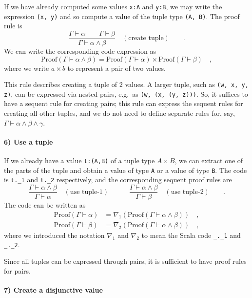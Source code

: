 If we have already computed some values \lstinline!x:A! and \lstinline!y:B!,
we may write the expression \lstinline!(x, y)! and so compute a value
of the tuple type \lstinline!(A, B)!. The proof rule is
\[
\frac{\Gamma\vdash\alpha\quad\quad\Gamma\vdash\beta}{\Gamma\vdash\alpha\wedge\beta}\quad(\text{create tuple})\quad\quad.
\]
We can write the corresponding code expression as
\[
\text{Proof}\left(\Gamma\vdash\alpha\wedge\beta\right)=\text{Proof}\left(\Gamma\vdash\alpha\right)\times\text{Proof}\left(\Gamma\vdash\beta\right)\quad,
\]
where we write $a\times b$ to represent a pair of two values.

This rule describes creating a tuple of $2$ values. A larger tuple,
such as \lstinline!(w, x, y, z)!, can be expressed via nested pairs,
e.g.~as \lstinline!(w, (x, (y, z)))!. So, it suffices to have a
sequent rule for creating pairs; this rule can express the sequent
rules for creating all other tuples, and we do not need to define
separate rules for, say, $\Gamma\vdash\alpha\wedge\beta\wedge\gamma$.

\paragraph{6) Use a tuple}

If we already have a value \lstinline!t:(A,B)! of a tuple type $A\times B$,
we can extract one of the parts of the tuple and obtain a value of
type \lstinline!A! or a value of type \lstinline!B!. The code is
\lstinline!t._1! and \lstinline!t._2! respectively, and the corresponding
sequent proof rules are
\[
\frac{\Gamma\vdash\alpha\wedge\beta}{\Gamma\vdash\alpha}\quad(\text{use tuple-}1)\quad\quad\quad\frac{\Gamma\vdash\alpha\wedge\beta}{\Gamma\vdash\beta}\quad(\text{use tuple-}2)\quad\quad.
\]
The code can be written as
\begin{align*}
\text{Proof}\left(\Gamma\vdash\alpha\right) & =\nabla_{1}\left(\text{Proof}\left(\Gamma\vdash\alpha\wedge\beta\right)\right)\quad,\\
\text{Proof}\left(\Gamma\vdash\beta\right) & =\nabla_{2}\left(\text{Proof}\left(\Gamma\vdash\alpha\wedge\beta\right)\right)\quad,
\end{align*}
where we introduced the notation $\nabla_{1}$ and $\nabla_{2}$ to
mean the Scala code \lstinline!_._1! and \lstinline!_._2!.

Since all tuples can be expressed through pairs, it is sufficient
to have proof rules for pairs.

\paragraph{7) Create a disjunctive value}

